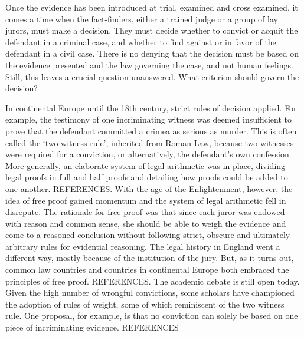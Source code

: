 \documentclass[10pt]{article}
\begin{document}

Once the evidence has been introduced at trial, examined and cross examined, it comes a time when the fact-finders, either a trained judge or a group of lay jurors, must make a decision. They must decide whether to convict or acquit the defendant in a criminal case, 
and whether to find against or in favor of the defendant in a civil case. There is no denying that the decision must be based on the evidence presented and the law governing the case, and not human feelings. Still, this leaves a crucial question unanswered. 
What criterion should govern the decision? 

In continental Europe until the 18th century, strict rules of decision applied. For example, the testimony of one incriminating witness was deemed insufficient to prove that the defendant committed a crimea as serious as murder. This is often called the `two witness rule', inherited from Roman Law, because two witnesses were required for a conviction, or alternatively, the defendant's own confession.  More generally, an elaborate system of legal arithmetic was in place, dividing legal proofs in full and half proofs and detailing how proofs 
could be added to one another. REFERENCES. With the age of the Enlightenment, however, 
the idea of free proof gained momentum and the system of legal arithmetic fell in disrepute.
The rationale for free proof was that since each juror was endowed with reason and common sense, she should be able to weigh the evidence and come to a reasoned conclusion without following strict, obscure and ultimately arbitrary rules for evidential reasoning. The legal history in England went a different way, mostly because of the institution of the jury. But, as it turns out, common law countries and countries in continental Europe both embraced the principles of free proof. REFERENCES. The academic debate is still open today. Given the high number of wrongful convictions, some scholars have championed the adoption of rules of weight, some of which reminiscent of the two witness rule. One proposal, for example, is that no conviction can solely be based on one piece of incriminating evidence. REFERENCES
\end{document}
